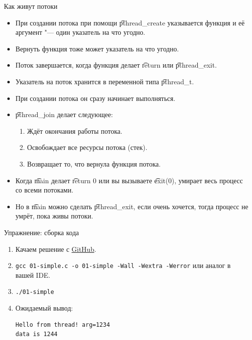 \begin{frame}{Как живут потоки}
	\begin{itemize}
		\item При создании потока при помощи \t{pthread\_create} указывается функция и её аргумент "--- один указатель на что угодно.
		\item Вернуть функция тоже может указатель на что угодно.
		\item Поток завершается, когда функция делает \t{return} или \t{pthread\_exit}.
		\item Указатель на поток хранится в переменной типа \t{pthread\_t}.
		\item При создании потока он сразу начинает выполняться.
		\item \t{pthread\_join} делает следующее:
			\begin{enumerate}
				\item Ждёт окончания работы потока.
				\item Освобождает все ресурсы потока (стек).
				\item Возвращает то, что вернула функция потока.
			\end{enumerate}
		\item Когда \t{main} делает \t{return 0} или вы вызываете \t{exit(0)}, умирает весь процесс со всеми потоками.
		\item Но в \t{main} можно сделать \t{pthread\_exit}, если очень хочется, тогда процесс не умрёт, пока живы потоки.
	\end{itemize}
\end{frame}

\begin{frame}[fragile]{Упражнение: сборка кода}
	\begin{enumerate}
		\item Качаем решение с \href{https://github.com/yeputons/fall-2016-paradigms/raw/master/161019/sources/01-simple.c}{GitHub}.
		\item \texttt{gcc 01-simple.c -o 01-simple -Wall -Wextra -Werror} или аналог в вашей IDE.
		\item \texttt{./01-simple}
		\item Ожидаемый вывод:
\begin{verbatim}
Hello from thread! arg=1234
data is 1244
\end{verbatim}
	\end{enumerate}
\end{frame}

